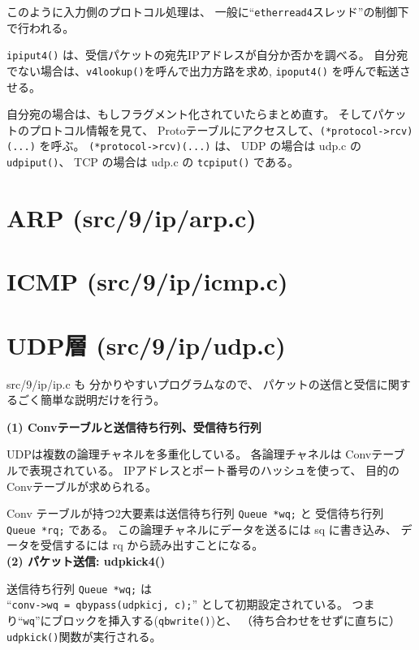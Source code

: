 このように入力側のプロトコル処理は、
一般に``{\tt etherread4}スレッド''の制御下で行われる。

\verb|ipiput4()| は、受信パケットの宛先IPアドレスが自分か否かを調べる。
自分宛でない場合は、\verb|v4lookup()|を呼んで出力方路を求め, 
\verb|ipoput4()| を呼んで転送させる。

自分宛の場合は、もしフラグメント化されていたらまとめ直す。
そしてパケットのプロトコル情報を見て、
Protoテーブルにアクセスして、\verb|(*protocol->rcv)(...)| を呼ぶ。
\verb|(*protocol->rcv)(...)| は、
UDP の場合は udp.c の \verb|udpiput()|、
TCP の場合は udp.c の \verb|tcpiput()| である。



\section{ ARP  (src/9/ip/arp.c)}

\vspace{4cm}


\section{ ICMP (src/9/ip/icmp.c)}

\vspace{4cm}


\section{ UDP層   (src/9/ip/udp.c)} 
 
src/9/ip/ip.c も 分かりやすいプログラムなので、
パケットの送信と受信に関するごく簡単な説明だけを行う。


{\bf \flushleft(1) Convテーブルと送信待ち行列、受信待ち行列}

UDPは複数の論理チャネルを多重化している。
各論理チャネルは Convテーブルで表現されている。
IPアドレスとポート番号のハッシュを使って、
目的のConvテーブルが求められる。

Conv テーブルが持つ2大要素は送信待ち行列 \verb|Queue *wq;| と
受信待ち行列 \verb|Queue *rq;| である。
この論理チャネルにデータを送るには sq に書き込み、
データを受信するには rq から読み出すことになる。
\\

{\bf \flushleft(2) パケット送信: udpkick4()}

送信待ち行列 \verb|Queue *wq;| は \\
``\verb|conv->wq = qbypass(udpkicj, c);|''
として初期設定されている。
つまり``{\tt wq}''にブロックを挿入する(\verb|qbwrite()|)と、
（待ち合わせをせずに直ちに）\verb|udpkick()|関数が実行される。

